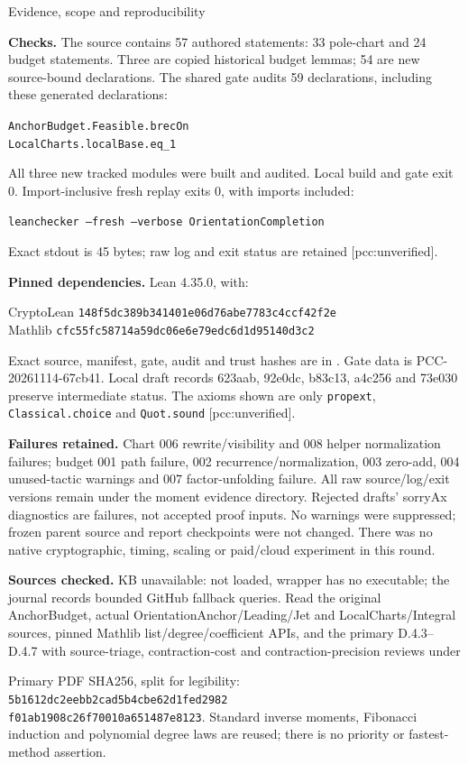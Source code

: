 \documentclass[10pt]{article}
\begin{document}
\newpage
\begin{center}{\Large Evidence, scope and reproducibility}\end{center}
\textbf{Checks.} The source contains 57 authored statements: 33 pole-chart
and 24 budget statements. Three are copied historical budget lemmas; 54 are
new source-bound declarations. The shared gate audits 59 declarations,
including these generated declarations:
\begin{center}\texttt{AnchorBudget.Feasible.brecOn}\\
\texttt{LocalCharts.localBase.eq\_1}\end{center}
All three new tracked modules were built and audited. Local build and gate
exit 0. Import-inclusive fresh replay exits 0, with imports included:
\begin{center}\texttt{leanchecker --fresh --verbose OrientationCompletion}\end{center}
Exact stdout is 45 bytes; raw log and exit status are retained [pcc:unverified].

\textbf{Pinned dependencies.} Lean 4.35.0, with:
\begin{center}\small
CryptoLean \texttt{148f5dc389b341401e06d76abe7783c4ccf42f2e}\\
Mathlib \texttt{cfc55fc58714a59dc06e6e79edc6d1d95140d3c2}
\end{center}
Exact source, manifest, gate, audit and trust hashes are in
. Gate data is PCC-20261114-67cb41.
Local draft records 623aab, 92e0dc, b83c13, a4c256 and 73e030 preserve
intermediate status. The axioms shown are only \texttt{propext},
\texttt{Classical.choice} and \texttt{Quot.sound} [pcc:unverified].

\textbf{Failures retained.} Chart 006 rewrite/visibility and 008 helper
normalization failures; budget 001 path failure, 002 recurrence/normalization,
003 zero-add, 004 unused-tactic warnings and 007 factor-unfolding failure.
All raw source/log/exit versions remain under the moment evidence directory.
Rejected drafts' sorryAx diagnostics are failures, not accepted proof inputs.
No warnings were suppressed; frozen parent source and report checkpoints
were not changed. There was no native cryptographic, timing, scaling or
paid/cloud experiment in this round.

\textbf{Sources checked.} KB unavailable: not loaded, wrapper has no
executable; the journal records bounded GitHub fallback queries. Read the
original AnchorBudget, actual OrientationAnchor/Leading/Jet and
LocalCharts/Integral sources, pinned Mathlib list/degree/coefficient APIs,
and the primary D.4.3--D.4.7 with source-triage, contraction-cost and
contraction-precision reviews under
\begin{center}\small{}\end{center}
Primary PDF SHA256, split for legibility:
\texttt{5b1612dc2eebb2cad5b4cbe62d1fed2982}\\
\texttt{f01ab1908c26f70010a651487e8123}.
Standard inverse moments, Fibonacci induction and polynomial degree laws
are reused; there is no priority or fastest-method assertion.
\end{document}
